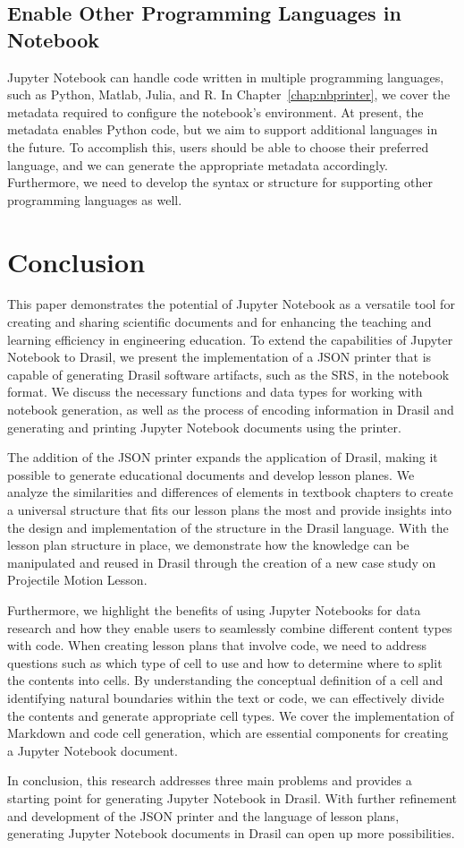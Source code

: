 \subsection{Enable Other Programming Languages in Notebook}
Jupyter Notebook can handle code written in multiple programming languages, 
such as Python, Matlab, Julia, and R. In Chapter~\ref{chap:nbprinter}, we cover 
the metadata required to configure the notebook's environment. At present, the 
metadata enables Python code, but we aim to support additional languages in the 
future. To accomplish this, users should be able to choose their preferred 
language, and we can generate the appropriate metadata accordingly. 
Furthermore, we need to develop the syntax or structure for supporting other 
programming languages as well.

\section{Conclusion}
This paper demonstrates the potential of Jupyter Notebook as a versatile 
tool for creating and sharing scientific documents and for enhancing the 
teaching and learning efficiency in engineering education. To extend the 
capabilities of Jupyter Notebook to Drasil, we present the implementation of 
a JSON printer that is capable of generating Drasil software artifacts, 
such as the SRS, in the notebook format. We discuss the necessary functions and 
data types for working with notebook generation, as well as the process of 
encoding information in Drasil and generating and printing Jupyter Notebook 
documents using the printer.

The addition of the JSON printer expands the application of Drasil, making it 
possible to generate educational documents and develop lesson planes. We 
analyze the similarities and differences of elements in textbook chapters to 
create a universal structure that fits our lesson plans the most and provide 
insights into the design and implementation of the structure in the Drasil 
language. With the lesson plan structure in place, we demonstrate how the 
knowledge can be manipulated and reused in Drasil through the creation of a new 
case study on Projectile Motion Lesson. 

Furthermore, we highlight the benefits of using Jupyter Notebooks for data 
research and how they enable users to seamlessly combine different content 
types with code. When creating lesson plans that involve code, we need to 
address questions such as which type of cell to use and how to determine where 
to split the contents into cells. By understanding the conceptual definition of 
a cell and identifying natural boundaries within the text or code, we can 
effectively divide the contents and generate appropriate cell types. We cover 
the implementation of Markdown and code cell generation, which are essential 
components for creating a Jupyter Notebook document. 

In conclusion, this research addresses three main problems and provides a 
starting point for generating Jupyter Notebook in Drasil. With further 
refinement and development of the JSON printer and the language of lesson 
plans, generating Jupyter Notebook documents in Drasil can open up more 
possibilities.   